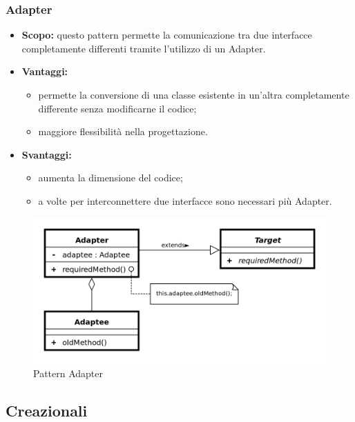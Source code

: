     \subsubsection{Adapter}
      \begin{itemize}
       \item \textbf{Scopo:} questo pattern permette la comunicazione tra due interfacce completamente differenti tramite l'utilizzo di un Adapter.
	\item \textbf{Vantaggi:}
	  \begin{itemize}
	   \item permette la conversione di una classe esistente in un'altra completamente differente senza modificarne il codice;
	   \item maggiore flessibilità nella progettazione.
	  \end{itemize}
	\item \textbf{Svantaggi:}
	  \begin{itemize}
	   \item aumenta la dimensione del codice;
	   \item a volte per interconnettere due interfacce sono necessari più Adapter.
	  \end{itemize}
	\end{itemize}
	\begin{figure}[h]
		\centering
		\includegraphics[width=\textwidth,height=\textheight,keepaspectratio,scale=0.1]{images/adapterpattern.png}
		\caption{Pattern Adapter}\label{fig:adapter1}
	\end{figure}
	\newpage
  \subsection{Creazionali}
	
